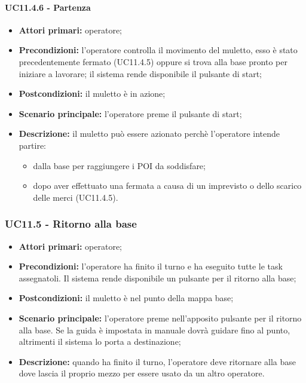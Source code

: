\paragraph{UC11.4.6 - Partenza}
\begin{itemize}
	\item 	\textbf{Attori primari:} operatore;
	\item 	\textbf{Precondizioni:} l'operatore controlla il movimento del muletto, esso è stato precedentemente fermato (UC11.4.5) oppure si trova alla base pronto per iniziare a lavorare; il sistema rende disponibile il pulsante di start;
	\item 	\textbf{Postcondizioni:} il muletto è in azione;
	\item 	\textbf{Scenario principale:} l'operatore preme il pulsante di start;
	\item 	\textbf{Descrizione:} il muletto può essere azionato perchè l'operatore intende partire:
	\begin{itemize}
		\item dalla base per raggiungere i POI da soddisfare;
		\item dopo aver effettuato una fermata a causa di un imprevisto o dello scarico delle merci (UC11.4.5).
	\end{itemize}
\end{itemize}


\subsubsection{UC11.5 - Ritorno alla base}
\begin{itemize}
	\item 	\textbf{Attori primari:} operatore;
	\item 	\textbf{Precondizioni:} l'operatore ha finito il turno e ha eseguito tutte le task assegnatoli. Il sistema rende disponibile un pulsante per il ritorno alla base;
	\item 	\textbf{Postcondizioni:} il muletto è nel punto della mappa base;
	\item 	\textbf{Scenario principale:} l'operatore preme nell'apposito pulsante per il ritorno alla base. Se la guida è impostata in manuale dovrà guidare fino al punto, altrimenti il sistema lo porta a destinazione;
	\item 	\textbf{Descrizione:} quando ha finito il turno, l'operatore deve ritornare alla base dove lascia il proprio mezzo per essere usato da un altro operatore.
\end{itemize}

